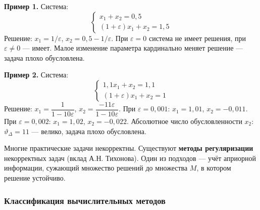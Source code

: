 \documentclass[14pt,a4paper]{extarticle}
\begin{document}
\textbf{Пример 1.} Система:
\[\begin{cases} x_1 + x_2 = 0{,}5 \\ (1 + \varepsilon)x_1 + x_2 = 1{,}5 \end{cases}\]
Решение: $x_1 = 1/\varepsilon$, $x_2 = 0{,}5 - 1/\varepsilon$. При $\varepsilon = 0$ система не имеет решения, при $\varepsilon \neq 0$ --- имеет. Малое изменение параметра кардинально меняет решение --- задача плохо обусловлена.

\textbf{Пример 2.} Система:
\[\begin{cases} 1{,}1x_1 + x_2 = 1{,}1 \\ (1 + \varepsilon)x_1 + x_2 = 1 \end{cases}\]
Решение: $x_1 = \dfrac{1}{1 - 10\varepsilon}$, $x_2 = \dfrac{-11\varepsilon}{1 - 10\varepsilon}$. При $\varepsilon = 0{,}001$: $x_1 = 1{,}01$, $x_2 = -0{,}011$. При $\varepsilon = 0{,}002$: $x_1 = 1{,}02$, $x_2 = -0{,}022$. Абсолютное число обусловленности $x_2$: $\vartheta_\Delta = 11$ --- велико, задача плохо обусловлена.

Многие практические задачи некорректны. Существуют \textbf{методы регуляризации} некорректных задач (вклад А.Н. Тихонова). Один из подходов --- учёт априорной информации, сужающий множество решений до множества $M$, в котором решение устойчиво.

\subsubsection{Классификация вычислительных методов}
\end{document}
